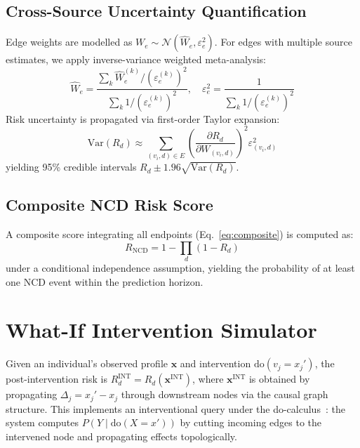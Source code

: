 \documentclass[runningheads]{llncs}
\begin{document}
\subsection{Cross-Source Uncertainty Quantification}\label{sec:uncert}

Edge weights are modelled as $W_e \sim \mathcal{N}(\hat{W}_e,
\varepsilon_e^2)$.  For edges with multiple source estimates, we apply
inverse-variance weighted meta-analysis:
\begin{equation}\label{eq:meta}
\hat{W}_e = \frac{\sum_k \hat{W}_e^{(k)} / (\varepsilon_e^{(k)})^2}
{\sum_k 1 / (\varepsilon_e^{(k)})^2}, \quad
\varepsilon_e^2 = \frac{1}{\sum_k 1 / (\varepsilon_e^{(k)})^2}
\end{equation}
Risk uncertainty is propagated via first-order Taylor expansion:
\begin{equation}\label{eq:riskvar}
\mathrm{Var}(R_d) \approx \sum_{(v_i,d) \in E}
\left(\frac{\partial R_d}{\partial W_{(v_i,d)}}\right)^2 \varepsilon_{(v_i,d)}^2
\end{equation}
yielding 95\% credible intervals $R_d \pm 1.96\sqrt{\mathrm{Var}(R_d)}$.

\subsection{Composite NCD Risk Score}\label{sec:composite}

A composite score integrating all endpoints (Eq.~\ref{eq:composite})
is computed as:
\begin{equation}\label{eq:composite}
R_{\mathrm{NCD}} = 1 - \prod_{d} (1 - R_d)
\end{equation}
under a conditional independence assumption, yielding the probability
of at least one NCD event within the prediction horizon.

\section{What-If Intervention Simulator}\label{sec:whatif}

Given an individual's observed profile $\mathbf{x}$ and intervention
$\mathrm{do}(v_j = x_j')$, the post-intervention risk is
$R_d^{\mathrm{INT}} = R_d(\mathbf{x}^{\mathrm{INT}})$, where
$\mathbf{x}^{\mathrm{INT}}$ is obtained by propagating
$\Delta_j = x_j' - x_j$ through downstream nodes via the causal
graph structure.  This implements an interventional query under the
do-calculus~\cite{pearl2009causality}: the system computes
$P(Y \mid \mathrm{do}(X = x'))$ by cutting incoming edges to the
intervened node and propagating effects topologically.
\end{document}
